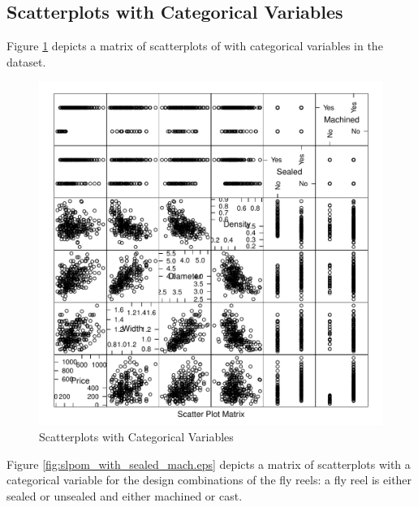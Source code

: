 \documentclass[11pt]{book}
\begin{document}
\pagebreak
\subsection*{Scatterplots with Categorical Variables}

Figure \ref{fig:slpom_with_cat} depicts a matrix of scatterplots
of with categorical variables in the dataset.

\begin{figure}[h!]
  \centering
  \includegraphics[scale = 0.5, keepaspectratio=true]{../Figures/slpom_with_cat}
  \caption{Scatterplots with Categorical Variables} \label{fig:slpom_with_cat}
\end{figure}


\pagebreak


Figure \ref{fig:slpom_with_sealed_mach.eps} depicts a matrix of scatterplots
with a categorical variable for the design combinations of the fly reels:
a fly reel is either sealed or unsealed and either machined or cast.
\end{document}
